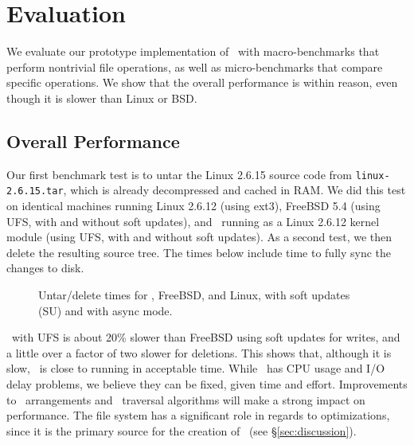 \section {Evaluation}
\label{sec:evaluation}

We evaluate our prototype implementation of \Kudos\ with macro-benchmarks that
perform nontrivial file operations, as well as micro-benchmarks that compare
specific operations.
We show that the overall performance is within reason, even though it is slower
than Linux or BSD.

\subsection {Overall Performance}

Our first benchmark test is to untar the Linux 2.6.15 source code from
\texttt{linux-2.6.15.tar}, which is already decompressed and cached in RAM. We
did this test on identical machines running Linux 2.6.12 (using ext3), FreeBSD
5.4 (using UFS, with and without soft updates), and \Kudos\ running as a Linux
2.6.12 kernel module (using UFS, with and without soft updates). As a second
test, we then delete the resulting source tree. The times below include time to
fully sync the changes to disk.

\begin{figure}[htb]
\caption{\label{fig:macro} Untar/delete times for \Kudos, FreeBSD, and Linux,
with soft updates (SU) and with async mode.}
\end{figure}

\Kudos\ with UFS is about 20\% slower than FreeBSD using soft updates for
writes, and a little over a factor of two slower for deletions. This shows
that, although it is slow, \Kudos\ is close to running in acceptable time.
While \Kudos\ has CPU usage and I/O delay problems, we believe they can be
fixed, given time and effort. Improvements to \chdesc\ arrangements and
\chdesc\ traversal algorithms will make a strong impact on performance.
The file system has a significant role in regards to optimizations, since it
is the primary source for the creation of
\chdescs\ (see \S\ref{sec:discussion}).

